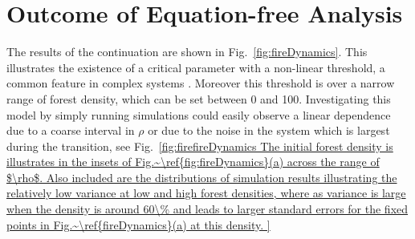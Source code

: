 \documentclass[11pt]{article}
\begin{document}
\section{Outcome of Equation-free Analysis}
The results of the continuation are shown in Fig.~\ref{fig:fireDynamics}. This illustrates the existence of a critical parameter with a non-linear threshold, a common feature in complex systems \cite{Fire}. Moreover this threshold is over a narrow range of forest density, which can be set between 0 and 100. Investigating this model by simply running simulations could easily observe a linear dependence due to a coarse interval in $\rho$ or due to the noise in the system which is largest during the transition, see Fig.~\ref{fig:firefireDynamics The initial forest density is illustrates in the insets of Fig.~\ref{fig:fireDynamics}(a) across the range of $\rho$. Also included are the distributions of simulation results illustrating the relatively low variance at low and high forest densities, where as variance is large when the density is around 60\% and leads to larger standard errors for the fixed points in Fig.~\ref{fireDynamics}(a) at this density.  

}
\end{document}
